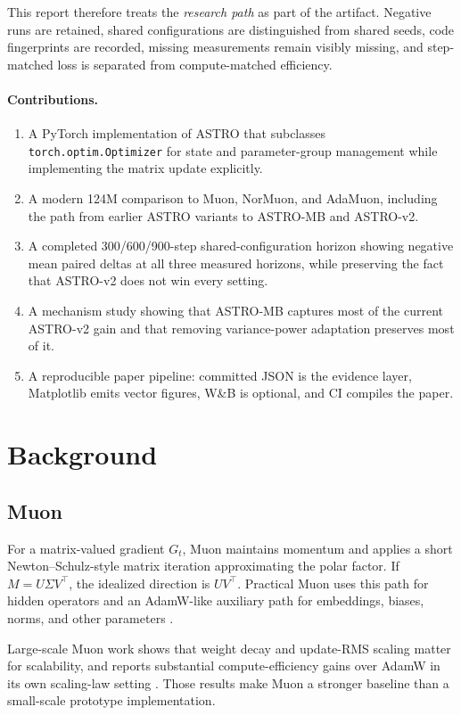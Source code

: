 \documentclass[10pt,twocolumn]{article}
\begin{document}
This report therefore treats the \emph{research path} as part of the artifact.
Negative runs are retained, shared configurations are distinguished from shared
seeds, code fingerprints are recorded, missing measurements remain visibly
missing, and step-matched loss is separated from compute-matched efficiency.

\paragraph{Contributions.}
\begin{enumerate}
  \item A PyTorch implementation of ASTRO that subclasses
  \texttt{torch.optim.Optimizer} for state and parameter-group management while
  implementing the matrix update explicitly.
  \item A modern 124M comparison to Muon, NorMuon, and AdaMuon, including the
  path from earlier ASTRO variants to ASTRO-MB and ASTRO-v2.
  \item A completed 300/600/900-step shared-configuration horizon showing
  negative mean paired deltas at all three measured horizons, while preserving
  the fact that ASTRO-v2 does not win every setting.
  \item A mechanism study showing that ASTRO-MB captures most of the current
  ASTRO-v2 gain and that removing variance-power adaptation preserves most of it.
  \item A reproducible paper pipeline: committed JSON is the evidence layer,
  Matplotlib emits vector figures, W\&B is optional, and CI compiles the paper.
\end{enumerate}

\section{Background}

\subsection{Muon}
For a matrix-valued gradient $G_t$, Muon maintains momentum and applies a short
Newton--Schulz-style matrix iteration approximating the polar factor. If
$M=U\Sigma V^\top$, the idealized direction is $UV^\top$. Practical Muon uses
this path for hidden operators and an AdamW-like auxiliary path for embeddings,
biases, norms, and other parameters \citep{jordan2024muon,liu2025scalable}.

Large-scale Muon work shows that weight decay and update-RMS scaling matter for
scalability, and reports substantial compute-efficiency gains over AdamW in its
own scaling-law setting \citep{liu2025scalable}. Those results make Muon a
stronger baseline than a small-scale prototype implementation.
\end{document}
